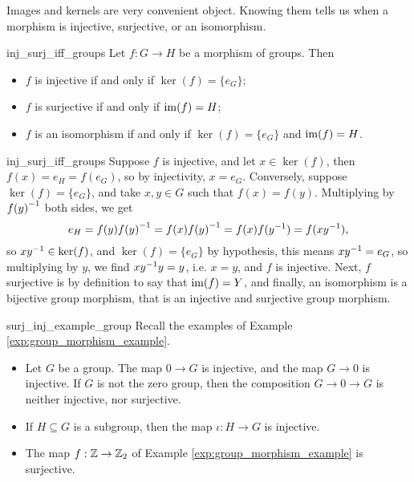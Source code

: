 Images and kernels are very convenient object. Knowing them tells us when a morphism is injective, surjective, or an isomorphism.
\begin{cprop}{}{inj_surj_iff_groups}
    Let \( f : G \to H \) be a morphism of groups. Then
    \begin{itemize}
        \item \( f \) is injective if and only if \( \ker(f) = \{ e_G \} \);
        \item \( f \) is surjective if and only if \( \operatorname{im}(f) = H \);
        \item \( f \) is an isomorphism if and only if \( \ker(f) = \{ e_G \} \) and \( \operatorname{im}(f) = H \).
    \end{itemize}
\end{cprop}
\begin{propproof}{inj_surj_iff_groups}
    Suppose \( f \) is injective, and let \( x \in \ker(f) \), then \( f(x) = e_H = f(e_G )\), so by injectivity, \( x = e_G \). Conversely, suppose \( \ker(f) = \{ e_G \} \), and take \( x, y \in G \) such that \( f(x) = f(y) \). Multiplying by \( {f(y)}^{-1} \) both sides, we get
    \begin{equation*}
        e_H = f(y) {f(y)}^{-1} = f(x) {f(y)}^{-1} = f(x)f({y}^{-1}) = f(x{y}^{-1}),
    \end{equation*}
    so \( x {y}^{-1} \in \ker(f) \), and \( \ker(f) = \{ e_G \} \) by hypothesis, this means \( x {y}^{-1} = e_G \), so multiplying by \( y \), we find \( x {y}^{-1} y = y \), i.e. \( x = y \), and \( f \) is injective. Next, \( f \) surjective is by definition to say that \( \operatorname{im}(f) = Y \), and finally, an isomorphism is a bijective group morphism, that is an injective and surjective group morphism.
\end{propproof}

\begin{cexp}{}{surj_inj_example_group}
    Recall the examples of Example \ref{exp:group_morphism_example}.
    \begin{itemize}
        \item Let \( G \) be a group. The map \( 0 \to G \) is injective, and the map \( G \to 0 \) is injective. If \( G \) is not the zero group, then the composition \( G \to 0 \to G \) is neither injective, nor surjective.
        \item If \( H \subseteq G \) is a subgroup, then the map \( \iota : H \to G \) is injective.
        \item The map \( f : \mathbb{Z} \to \mathbb{Z}_2 \) of Example \ref{exp:group_morphism_example} is surjective. 
    \end{itemize}
\end{cexp}

